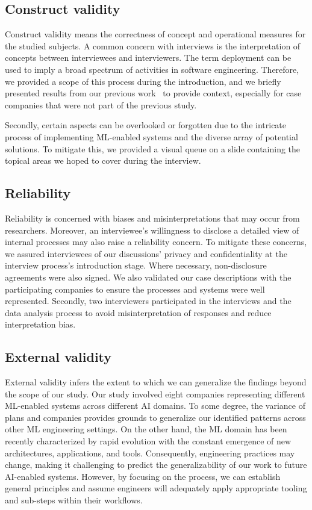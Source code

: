 \subsection{Construct validity}
\label{subsec: construct validity}
Construct validity means the correctness of concept and operational measures for the studied subjects. A common concern with interviews is the interpretation of concepts between interviewees and interviewers. The term deployment can be used to imply a broad spectrum of activities in software engineering. Therefore, we provided a scope of this process during the introduction, and we briefly presented results from our previous work~\cite{muiruri2022practices} to provide context, especially for case companies that were not part of the previous study.

Secondly, certain aspects can be overlooked or forgotten due to the intricate process of implementing ML-enabled systems and the diverse array of potential solutions. To mitigate this, we provided a visual queue on a slide containing the topical areas we hoped to cover during the interview. 

\subsection{Reliability}
\label{subsec: internal validity}
Reliability is concerned with biases and misinterpretations that may occur from researchers. Moreover, an interviewee's willingness to disclose a detailed view of internal processes may also raise a reliability concern. To mitigate these concerns, we assured interviewees of our discussions' privacy and confidentiality at the interview process's introduction stage. Where necessary, non-disclosure agreements were also signed. We also validated our case descriptions with the participating companies to ensure the processes and systems were well represented. Secondly, two interviewers participated in the interviews and the data analysis process to avoid misinterpretation of responses and reduce interpretation bias.

\subsection{External validity}
\label{subsec: external validity}
External validity infers the extent to which we can generalize the findings beyond the scope of our study. Our study involved eight companies representing different ML-enabled systems across different AI domains. To some degree, the variance of plans and companies provides grounds to generalize our identified patterns across other ML engineering settings. On the other hand, the ML domain has been recently characterized by rapid evolution with the constant emergence of new architectures, applications, and tools. Consequently, engineering practices may change, making it challenging to predict the generalizability of our work to future AI-enabled systems. However, by focusing on the process, we can establish general principles and assume engineers will adequately apply appropriate tooling and sub-steps within their workflows.

